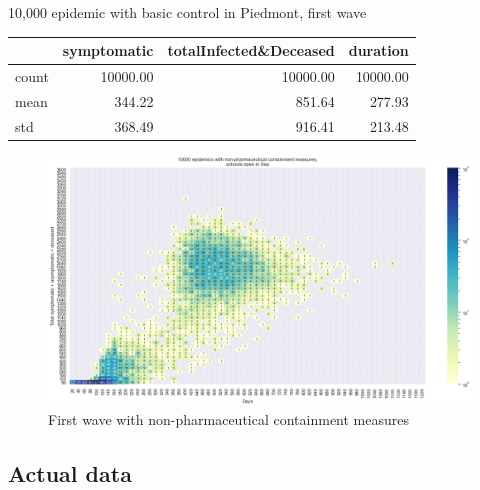 \documentclass[8pt]{beamer}
\begin{document}
\begin{frame}{10,000 epidemic with basic control in Piedmont, first wave}


\begin{table}[H]
\center
\tiny

\begin{tabular}{lrrr}
\toprule
{} &  symptomatic &  totalInfected\&Deceased &  duration \\
\midrule
count &     10000.00 &                10000.00 &  10000.00 \\
mean  &       344.22 &                  851.64 &    277.93 \\
std   &       368.49 &                  916.41 &    213.48 \\
\bottomrule
\end{tabular}

\label{basicCTab}
\end{table}

\begin{figure}[H]
\center
\includegraphics[scale=0.22]{10kBasicC.png}
\caption{First wave with non-pharmaceutical containment measures} 
\label{basicC}
\end{figure}

\end{frame}


\subsection{Actual data}
\end{document}
